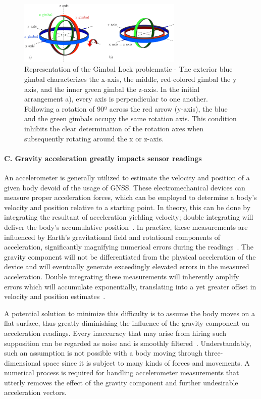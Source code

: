 \begin{figure}[!h]
    \centering
    \includegraphics[width=0.7\textwidth]{figures/gimbal lock.png}
    \caption{Representation of the Gimbal Lock problematic \cite{zeitlhofler2019nominal} - The exterior blue gimbal characterizes the x-axis, the middle, red-colored gimbal the y axis, and the inner green gimbal the z-axis. In the initial arrangement a), every axis is perpendicular to one another. Following a rotation of 90º across the red arrow (y-axis), the blue and the green gimbals occupy the same rotation axis. This condition inhibits the clear determination of the rotation axes when subsequently rotating around the x or z-axis. }
    \label{fig:gimballock}
\end{figure}

\paragraph{C. Gravity acceleration greatly impacts sensor readings}
An accelerometer is generally utilized to estimate the velocity and position of a given body devoid of the usage of GNSS. These electromechanical devices can measure proper acceleration forces, which can be employed to determine a body’s velocity and position relative to a starting point. In theory, this can be done by integrating the resultant of acceleration yielding velocity; double integrating will deliver the body’s accumulative position~\cite{yang2006simple}. In practice, these measurements are influenced by Earth’s gravitational field and rotational components of acceleration, significantly magnifying numerical errors during the readings~\cite{nistler2011gravity}. The gravity component will not be differentiated from the physical acceleration of the device and will eventually generate exceedingly elevated errors in the measured acceleration. Double integrating these measurements will inherently amplify errors which will accumulate exponentially, translating into a yet greater offset in velocity and position estimates~\cite{thong2004numerical}.

A potential solution to minimize this difficulty is to assume the body moves on a flat surface, thus greatly diminishing the influence of the gravity component on acceleration readings. Every inaccuracy that may arise from hiring such supposition can be regarded as noise and is smoothly filtered~\cite{nistler2011gravity}. Understandably, such an assumption is not possible with a body moving through three-dimensional space since it is subject to many kinds of forces and movements.  A numerical process is required for handling accelerometer measurements that utterly removes the effect of the gravity component and further undesirable acceleration vectors.





